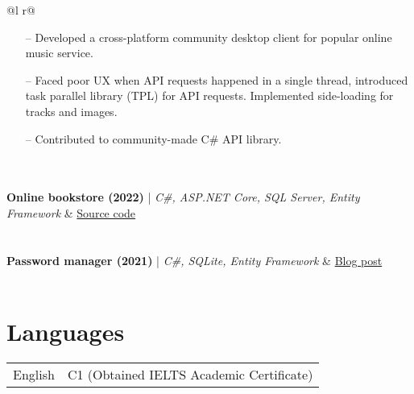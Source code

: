 \documentclass[a4paper,12pt]{article}
\begin{document}
\begin{tabularx}{\linewidth}{ @{}l r@{} }
{\begin{minipage}[t]{\linewidth}
    \begin{itemize}[nosep,after=\strut, leftmargin=1em, itemsep=3pt]
        \item[--] Developed a cross-platform community desktop client for popular online music service.
        \item [--] Faced poor UX when API requests happened in a single thread, introduced task parallel library (TPL) for API requests. Implemented side-loading for tracks and images.
        \item [--] Contributed to community-made C\# API library.
    \end{itemize}
    \end{minipage}
}  \\
\\
\textbf{Online bookstore (2022)} | \emph{C\#, ASP.NET Core, SQL Server, Entity Framework} & \hfill \href{https://github.com/andude10/The-Tome/}{Source code} \\[3.75pt]
  \\
\\
\textbf{Password manager (2021)} | \emph{C\#, SQLite, Entity Framework} & \hfill \href{https://andude10.github.io/projects/SecurePass/}{Blog post} \\[3.75pt]
  \\
\end{tabularx}

\section{Languages}

\begin{tabularx}{\linewidth}{@{}l X@{}}
English  &  \normalsize{C1 (Obtained IELTS Academic Certificate)}\\
\end{tabularx}

\vfill
{}
\end{document}
